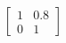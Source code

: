 \documentclass[preview]{standalone}
\begin{document}
\begin{align*}
\begin{bmatrix} 1 & 0.8 \\ 0 & 1 \end{bmatrix}
\end{align*}
\end{document}
